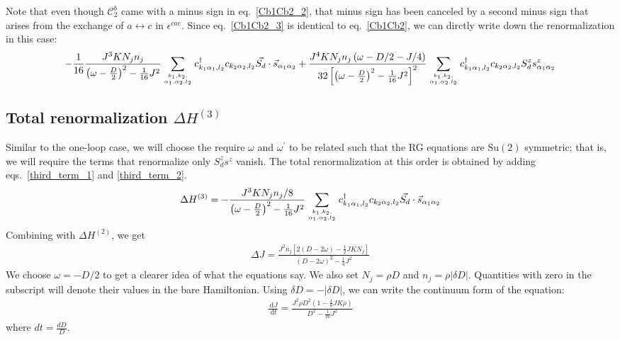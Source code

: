 \documentclass{revtex4-2}
\numberwithin{equation}{section}
\begin{document}
Note that even though \(\mathcal{C}^b_2\) came with a minus sign in eq.~\ref{Cb1Cb2_2}, that minus sign has been canceled by a second minus sign that arises from the exchange of \(a \leftrightarrow c\) in \(\epsilon^{cae}\). Since eq.~\ref{Cb1Cb2_3} is identical to eq.~\ref{Cb1Cb2}, we can dirctly write down the renormalization in this case:
\begin{equation}\begin{aligned}
	\label{third_term_2}
	-\frac{1}{16}\frac{J^3 K N_j n_j }{\left(\omega - \frac{D}{2}\right)^2 - \frac{1}{16}J^2}\sum_{k_1,k_2,\atop{\alpha_1,\alpha_2,l_2}}c^\dagger_{k_1\alpha_1,l_2}c_{k_2 \alpha_2,l_2} \vec{S_d}\cdot\vec{s}_{\alpha_1\alpha_2} + \frac{J^4 K N_j n_j \left( \omega - D/2 - J/4 \right) }{32\left[\left(\omega - \frac{D}{2}\right)^2 - \frac{1}{16}J^2\right]^2}\sum_{k_1,k_2,\atop{\alpha_1,\alpha_2,l_2}} c^\dagger_{k_1 \alpha_1,l_2}c_{k_2 \alpha_2,l_2}S_d^z s^z_{\alpha_1\alpha_2}
\end{aligned}\end{equation}

\subsection{Total renormalization \(\Delta H^{(3)}\)}
Similar to the one-loop case, we will choose the require \(\omega\) and \(\omega^\prime\) to be related such that the  RG equations are \(\mathrm{Su}(2)\) symmetric; that is, we will require the terms that renormalize only \(S_d^z s^z\) vanish. The total renormalization at this order is obtained by adding eqs.~\ref{third_term_1} and \ref{third_term_2}.
\begin{equation}\begin{aligned}
	\Delta H^{(3)} = -\frac{J^3 K N_j n_j / 8}{\left(\omega - \frac{D}{2}\right)^2 - \frac{1}{16}J^2}\sum_{k_1,k_2,\atop{\alpha_1,\alpha_2,l_2}}c^\dagger_{k_1\alpha_1,l_2}c_{k_2 \alpha_2,l_2} \vec{S_d}\cdot\vec{s}_{\alpha_1\alpha_2}
\end{aligned}\end{equation}
Combining with \(\Delta H^{(2)}\), we get
\begin{equation}\begin{aligned}
	\Delta J = \frac{J^2 n_j \left[2 \left(D - 2\omega\right) - \frac{1}{2}J K N_j\right]}{\left(D - 2\omega\right)^2 - \frac{1}{4}J^2}
\end{aligned}\end{equation}
We choose \(\omega = -D/2\) to get a clearer idea of what the equations say. We also set \(N_j = \rho D\) and \(n_j = \rho |\delta D|\). Quantities with zero in the subscript will denote their values in the bare Hamiltonian. Using \(\delta D = -|\delta D|\), we can write the continuum form of the equation:
\begin{equation}\begin{aligned}
	\frac{\:\mathrm{d}J}{\:\mathrm{d}t} = \frac{J^2 \rho D^2 \left(1 - \frac{1}{8}JK\rho\right)}{D^2 - \frac{1}{16}J^2}
\end{aligned}\end{equation}
where \(dt = \frac{dD}{D}\).
\end{document}
